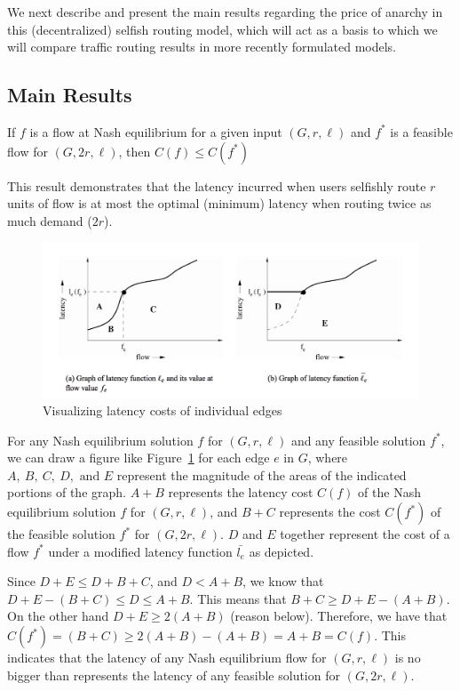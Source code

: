 We next describe and present the main results regarding the price of anarchy in this (decentralized) selfish routing model, which will act as a basis to which we will compare traffic routing results in more recently formulated models.

\subsection{Main Results}
\begin{theorem}
    If $f$ is a flow at Nash equilibrium for a given input $(G, r, \ell)$ and $f^*$ is a feasible flow for $(G, 2r, \ell)$, then $C(f) \leq C(f^*)$
\end{theorem}

\begin{proof-sketch}
    This result demonstrates that the latency incurred when users selfishly route $r$ units of flow is at most the optimal (minimum) latency when routing twice as much demand ($2r$).

\begin{figure}[t!]
    \centering
    \includegraphics[width=.7\textwidth]{graph}
    \caption{Visualizing latency costs of individual edges}
    \label{fig:thm1}
\end{figure}

    For any Nash equilibrium solution $f$ for $(G, r, \ell)$ and any feasible solution $f^*$, we can draw a figure like Figure~\ref{fig:thm1} for each edge $e$ in $G$, where $A,~B,~C,~D,\text{ and } E$ represent the magnitude of the areas of the indicated portions of the graph.
    $A+B$ represents the latency cost $C(f)$ of the Nash equilibrium solution $f$ for $(G, r, \ell)$, and $B+C$ represents the cost $C(f^*)$ of the feasible solution $f^*$ for $(G, 2r, \ell)$. $D$ and $E$ together represent the
    cost of a flow $f^*$ under a modified latency function $\bar{l_e}$ as depicted.
    
    Since $D+E \le D+B+C$, and $D < A+B$, we know that $D+E-(B+C)\le D \le A+B $. This means that $B+C\ge D+E -(A+B)$. On the other hand $D+E\ge 2(A+B)$ (reason below). Therefore, we have that $C(f^*)=(B+C)\ge 2(A+B)-(A+B)= A+B= C(f)$. 
    This indicates that the latency of any Nash equilibrium flow for $(G, r, \ell)$ is no bigger than represents the latency of any feasible solution for $(G, 2r, \ell)$.
    

\end{proof-sketch}
